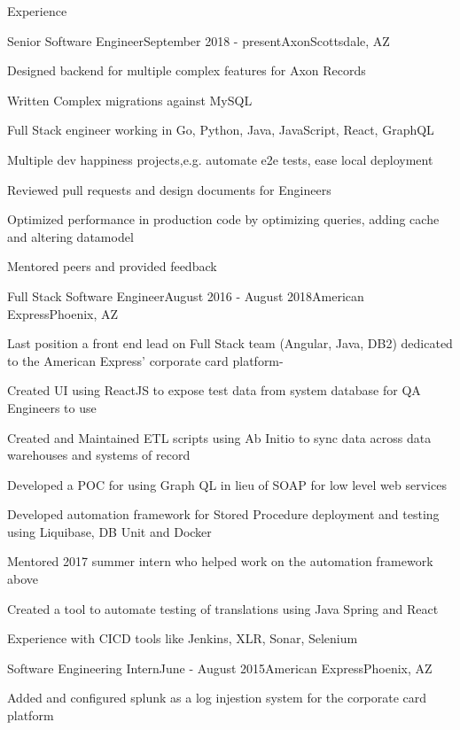 \documentclass{resume} %
\begin{document}
\begin{rSection}{Experience}

\begin{rSubsection}{Senior Software Engineer}{September 2018 - present}{Axon}{Scottsdale, AZ}
\item Designed backend for multiple complex features for Axon Records
\item Written Complex migrations against MySQL
\item Full Stack engineer working in Go, Python, Java, JavaScript, React, GraphQL
\item Multiple dev happiness projects,e.g. automate e2e tests, ease local deployment
\item Reviewed pull requests and design documents for Engineers
\item Optimized performance in production code by optimizing queries, adding cache and altering datamodel
\item Mentored peers and provided feedback

\end{rSubsection}

\begin{rSubsection}{Full Stack Software Engineer}{August 2016 - August 2018}{American Express}{Phoenix, AZ}

\item Last position a front end lead on Full Stack team (Angular, Java, DB2) dedicated to the American Express' corporate card platform-\\

\item Created UI using ReactJS to expose test data from system database for QA Engineers to use
\item Created and Maintained ETL scripts using Ab Initio to sync data across data warehouses and systems of record
\item Developed a POC for using Graph QL in lieu of SOAP for low level web services
\item Developed automation framework for Stored Procedure deployment and testing using Liquibase, DB Unit and Docker
\item Mentored 2017 summer intern who helped work on the automation framework above

\item Created a tool to automate testing of translations using Java Spring and React
\item Experience with CICD tools like Jenkins, XLR, Sonar, Selenium
\end{rSubsection}

\begin{rSubsection}{Software Engineering Intern}{June - August 2015}{American Express}{Phoenix, AZ}
\item Added and configured splunk as a log injestion system for the corporate card platform

\end{rSubsection}

\end{rSection}
\end{document}
